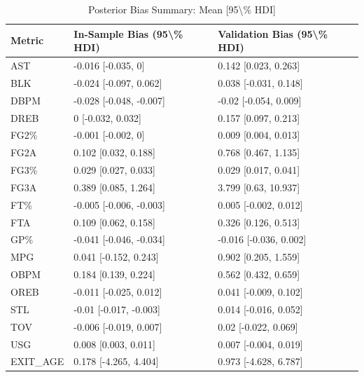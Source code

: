 \begin{table}[t]
\caption*{
{\fontsize{20}{25}\selectfont  Posterior Bias Summary: Mean [95\textbackslash{}\% HDI]\fontsize{12}{15}\selectfont }
} 
\fontsize{12.0pt}{14.0pt}\selectfont
\begin{tabular*}{\linewidth}{@{\extracolsep{\fill}}lll}
\toprule
Metric & In-Sample Bias (95\textbackslash{}\% HDI) & Validation Bias (95\textbackslash{}\% HDI) \\ 
\midrule\addlinespace[2.5pt]
AST & -0.016 [-0.035, 0] & 0.142 [0.023, 0.263] \\ 
BLK & -0.024 [-0.097, 0.062] & 0.038 [-0.031, 0.148] \\ 
DBPM & -0.028 [-0.048, -0.007] & -0.02 [-0.054, 0.009] \\ 
DREB & 0 [-0.032, 0.032] & 0.157 [0.097, 0.213] \\ 
FG2\% & -0.001 [-0.002, 0] & 0.009 [0.004, 0.013] \\ 
FG2A & 0.102 [0.032, 0.188] & 0.768 [0.467, 1.135] \\ 
FG3\% & 0.029 [0.027, 0.033] & 0.029 [0.017, 0.041] \\ 
FG3A & 0.389 [0.085, 1.264] & 3.799 [0.63, 10.937] \\ 
FT\% & -0.005 [-0.006, -0.003] & 0.005 [-0.002, 0.012] \\ 
FTA & 0.109 [0.062, 0.158] & 0.326 [0.126, 0.513] \\ 
GP\% & -0.041 [-0.046, -0.034] & -0.016 [-0.036, 0.002] \\ 
MPG & 0.041 [-0.152, 0.243] & 0.902 [0.205, 1.559] \\ 
OBPM & 0.184 [0.139, 0.224] & 0.562 [0.432, 0.659] \\ 
OREB & -0.011 [-0.025, 0.012] & 0.041 [-0.009, 0.102] \\ 
STL & -0.01 [-0.017, -0.003] & 0.014 [-0.016, 0.052] \\ 
TOV & -0.006 [-0.019, 0.007] & 0.02 [-0.022, 0.069] \\ 
USG & 0.008 [0.003, 0.011] & 0.007 [-0.004, 0.019] \\ 
EXIT\_AGE & 0.178 [-4.265, 4.404] & 0.973 [-4.628, 6.787] \\ 
\bottomrule
\end{tabular*}
\end{table}

